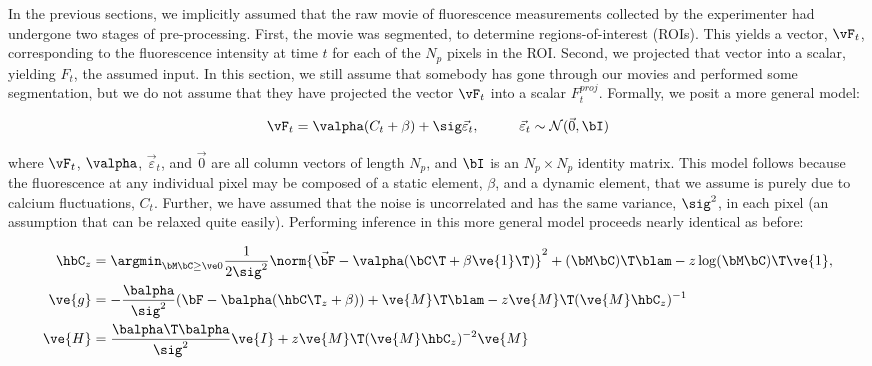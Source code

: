 In the previous sections, we implicitly assumed that the raw movie of fluorescence measurements collected by the experimenter had undergone two stages of pre-processing.  First, the movie was segmented, to determine regions-of-interest (ROIs).  This yields a vector, $\vF_t$, corresponding to the fluorescence intensity at time $t$ for each of the $N_p$ pixels in the ROI.  Second, we projected that vector into a scalar, yielding $F_t$, the assumed input.  In this section, we still assume that somebody has gone through our movies and performed some segmentation, but we do not assume that they have projected the vector $\vF_t$ into a scalar $F_t^{proj}$.  Formally, we posit a more general model:

\begin{align} \label{eq:bF}
\vF_t &= \valpha (C_t + \beta) +  \sig \vec{\varepsilon}_t, \qquad &\vec{\varepsilon}_t \sim \mathcal{N}(\vec{0},\bI)   
\end{align}

\noindent where $\vF_t$, $\valpha$, $\vec{\varepsilon}_t$, and $\vec{0}$  are all column vectors of length $N_p$, and $\bI$ is an $N_p \times N_p$ identity matrix.  This model follows because the fluorescence at any individual pixel may be composed of a static element, $\beta$, and a dynamic element, that we assume is purely due to calcium fluctuations, $C_t$.  Further, we have assumed that the noise is uncorrelated and has the same variance, $\sig^2$, in each pixel (an assumption that can be relaxed quite easily).  Performing inference in this more general model proceeds nearly identical as before:

\begin{align} 
\hbC_{\zzz} 
&= \az  \frac{1}{2 \sig^2} \norm{\vec{\bF} - \valpha (\bC\T +\beta\ve{1}\T)}^2 + (\bM \bC )\T \blam  - \zzz \log(\bM \bC)\T\ve{1},  \label{eq:eta4}\\
\ve{g} &= -\frac{\balpha}{\sig^2}(\bF -\balpha({\hbC\T}_{\zzz} + \beta)) + \ve{M}\T\blam - \zzz \ve{M}\T (\ve{M} \hbC_{\zzz})^{-1} \label{eq:g2} \\
\ve{H} &= \frac{\balpha\T \balpha}{\sig^2} \ve{I} + \zzz \ve{M}\T (\ve{M} \hbC_{\zzz})^{-2} \ve{M} \label{eq:H2}
\end{align}

